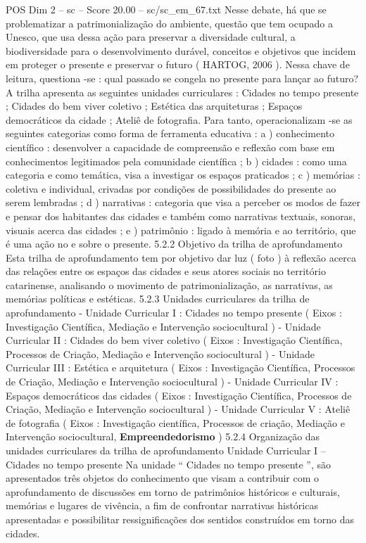 \begin{textsample}{POS Dim 2 – sc – Score 20.00 – sc/sc\_em\_67.txt}
Nesse debate, há que se problematizar a patrimonialização do ambiente, questão que tem ocupado a Unesco, que usa dessa ação para preservar a diversidade cultural, a biodiversidade para o desenvolvimento durável, conceitos e objetivos que incidem em proteger o presente e preservar o futuro ( HARTOG, 2006 ).
Nessa chave de leitura, questiona -se : qual passado se congela no presente para lançar ao futuro?
A trilha apresenta as seguintes unidades curriculares : Cidades no tempo presente ; Cidades do bem viver coletivo ; Estética das arquiteturas ; Espaços democráticos da cidade ; Ateliê de fotografia.
Para tanto, operacionalizam -se as seguintes categorias como forma de ferramenta educativa : a ) conhecimento científico : desenvolver a capacidade de compreensão e reflexão com base em conhecimentos legitimados pela comunidade científica ; b ) cidades : como uma categoria e como temática, visa a investigar os espaços praticados ; c ) memórias : coletiva e individual, crivadas por condições de possibilidades do presente ao serem lembradas ; d ) narrativas : categoria que visa a perceber os modos de fazer e pensar dos habitantes das cidades e também como narrativas textuais, sonoras, visuais acerca das cidades ; e ) patrimônio : ligado à memória e ao território, que é uma ação no e sobre o presente. 5.2.2 Objetivo da trilha de aprofundamento Esta trilha de aprofundamento tem por objetivo dar luz ( foto ) à reflexão acerca das relações entre os espaços das cidades e seus atores sociais no território catarinense, analisando o movimento de patrimonialização, as narrativas, as memórias políticas e estéticas. 5.2.3 Unidades curriculares da trilha de aprofundamento - Unidade Curricular I : Cidades no tempo presente ( Eixos : Investigação Científica, Mediação e Intervenção sociocultural ) - Unidade Curricular II : Cidades do bem viver coletivo ( Eixos : Investigação Científica, Processos de Criação, Mediação e Intervenção sociocultural ) - Unidade Curricular III : Estética e arquitetura ( Eixos : Investigação Científica, Processos de Criação, Mediação e Intervenção sociocultural ) - Unidade Curricular IV : Espaços democráticos das cidades ( Eixos : Investigação Científica, Processos de Criação, Mediação e Intervenção sociocultural ) - Unidade Curricular V : Ateliê de fotografia ( Eixos : Investigação científica, Processos de criação, Mediação e Intervenção sociocultural, \textbf{Empreendedorismo} ) 5.2.4 Organização das unidades curriculares da trilha de aprofundamento Unidade Curricular I – Cidades no tempo presente Na unidade “ Cidades no tempo presente ”, são apresentados três objetos do conhecimento que visam a contribuir com o aprofundamento de discussões em torno de patrimônios históricos e culturais, memórias e lugares de vivência, a fim de confrontar narrativas históricas apresentadas e possibilitar ressignificações dos sentidos construídos em torno das cidades.

\end{textsample}
